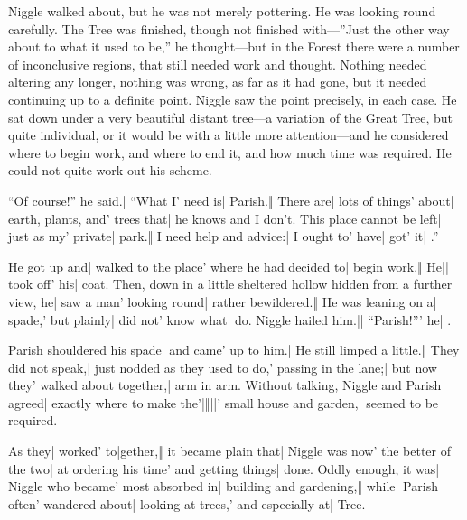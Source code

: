 \onlyscore{\enlargethispage{2\baselineskip}}
Niggle walked about, but he was not merely pottering. He was looking round carefully. The Tree was finished, though not finished with—”Just the other way about to what it used to be,” he thought—but in the Forest there were a number of inconclusive regions, that still needed work and thought. Nothing needed altering any longer, nothing was wrong, as far as it had gone, but it needed continuing up to a definite point. Niggle saw the point precisely, in each case. He sat down under a very beautiful distant tree—a variation of the Great Tree, but quite individual, or it would be with a little more attention—and he considered where to begin work, and where to end it, and how much time was required. He could not quite work out his scheme.

\onlyscore{\bigskip}

\begin{itemize}
\halfone “Of course!” he said.| “What I' need is| Parish.‖ There are| lots of things' about| earth, plants, and' trees that| he knows and I don’t.
\halftwo {}This place cannot be left| just as my' private| park.‖ I need help and advice:| I ought to' have| got' it| .”
\end{itemize}

\begin{itemize}
\halfone He got up and| walked to the place' where he had decided to| begin work.‖ He|| took off' his| coat.
\halftwo Then, down in a little sheltered hollow hidden from a further view, he| saw a man' looking round| rather bewildered.‖ He was leaning on a| spade,' but plainly| did not' know what|  do.
\quarterfour Niggle hailed him.|| “Parish!”' he| .
\end{itemize}

\begin{itemize}
\halfone Parish shouldered his spade| and came' up to him.| He still limped a little.‖ They did not speak,| just nodded as they used to do,' passing in the lane;| but now they' walked about together,| arm in arm.
\halftwo Without talking, Niggle and Parish agreed| exactly where to make the'|‖||' small house and garden,|  seemed to be required.
\end{itemize}

\begin{itemize}
\halfone As they| worked' to|gether,‖ it became plain that| Niggle was now' the better of the two| at ordering his time' and getting things| done.
\halftwo Oddly enough, it was| Niggle who became' most absorbed in| building and gardening,‖ while| Parish often' wandered about| looking at trees,' and especially at|  Tree.
\end{itemize}

